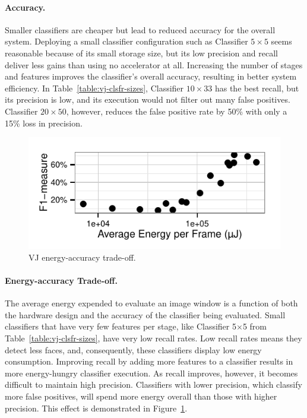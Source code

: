 \paragraph{Accuracy.}
Smaller classifiers are cheaper but lead to reduced accuracy
for the overall system.
Deploying a small classifier configuration such as Classifier $5\times 5$ seems reasonable
because of its small storage size, but its low
precision and recall deliver less gains than using no accelerator at all. Increasing
the number of stages and features improves the classifier's overall accuracy, resulting
in better system efficiency. In Table~\ref{table:vj-clsfr-sizes},
Classifier $10\times 33$ has the best recall, but its precision
is low, and its execution would not filter out many false positives. Classifier
$20\times 50$, however, reduces the false positive rate by 50\% with only a 15\% loss in precision.

\begin{figure}[h]
\centering
    \begin{center}
\includegraphics[width=.4\textwidth]{nsp-figs/eval_vj_energ_acc.pdf}
    \end{center}
    \caption{VJ energy-accuracy trade-off.}
    \label{fig:vj-tradeoff}
\end{figure}

\paragraph{Energy-accuracy Trade-off.} The average energy expended to evaluate an image window
is a function of both the hardware design and the accuracy of the classifier being evaluated.
Small classifiers that have very few features per stage, like Classifier 5$\times$5 from
Table~\ref{table:vj-clsfr-sizes}, have very low recall rates. Low recall rates means they detect less
faces, and, consequently, these classifiers display low energy consumption. Improving recall by
adding more features to a classifier results in more energy-hungry classifier execution. As recall
improves, however, it becomes difficult to maintain high precision. Classifiers with lower precision,
which classify more false positives, will spend more energy overall than those with higher precision.
This effect is demonstrated in Figure~\ref{fig:vj-tradeoff}.


